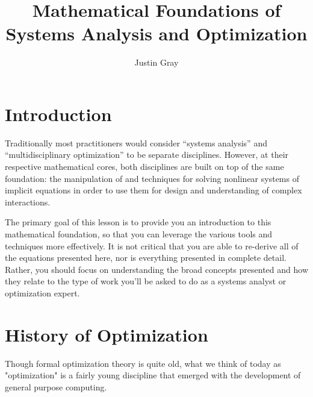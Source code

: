 \documentclass[conf]{new-aiaa}
\begin{document}
\title{Mathematical Foundations of Systems Analysis and Optimization}
\author{Justin Gray}

\maketitle


\section{Introduction}
    Traditionally most practitioners would consider ``systems analysis'' and ``multidisciplinary optimization'' to be separate disciplines. 
    However, at their respective mathematical cores, both disciplines are built on top of the same foundation: 
    the manipulation of and techniques for solving nonlinear systems of implicit equations in order to use them for design and understanding of complex interactions.

    The primary goal of this lesson is to provide you an introduction to this mathematical foundation, 
    so that you can leverage the various tools and techniques more effectively. 
    It is not critical that you are able to re-derive all of the equations presented here, nor is everything presented in complete detail. 
    Rather, you should focus on understanding the broad concepts presented and how they relate to the type of work you'll be asked to do as a 
    systems analyst or optimization expert. 


\section{History of Optimization}


\noindent Though formal optimization theory is quite old, what we think of today as "optimization" is a fairly young discipline that emerged with the development of general purpose computing. 
\end{document}
